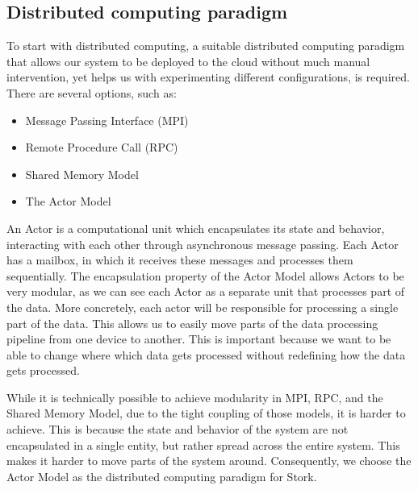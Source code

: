 \documentclass[a4paper]{article}
\begin{document}
\subsection{Distributed computing paradigm}
\label{sec:distributedcomputingparadigm}
To start with distributed computing, a suitable distributed computing paradigm that allows our system to be deployed to the cloud without much manual intervention, yet helps us with experimenting different configurations, is required. There are several options, such as:
\begin{itemize}
    \item Message Passing Interface (MPI)\cite{MPI}
    \item Remote Procedure Call (RPC)\cite{RPC}
    \item Shared Memory Model\cite{SMM}
    \item The Actor Model\cite{ActorModel}
\end{itemize}
An Actor is a computational unit which encapsulates its state and behavior, interacting with each other through asynchronous message passing. Each Actor has a mailbox, in which it receives these messages and processes them sequentially. The encapsulation property of the Actor Model allows Actors to be very modular, as we can see each Actor as a separate unit that processes part of the data. More concretely, each actor will be responsible for processing a single part of the data. This allows us to easily move parts of the data processing pipeline from one device to another. This is important because we want to be able to change where which data gets processed without redefining how the data gets processed.

While it is technically possible to achieve modularity in MPI, RPC, and the Shared Memory Model, due to the tight coupling of those models, it is harder to achieve. This is because the state and behavior of the system are not encapsulated in a single entity, but rather spread across the entire system. This makes it harder to move parts of the system around. Consequently, we choose the Actor Model as the distributed computing paradigm for Stork.
\end{document}
